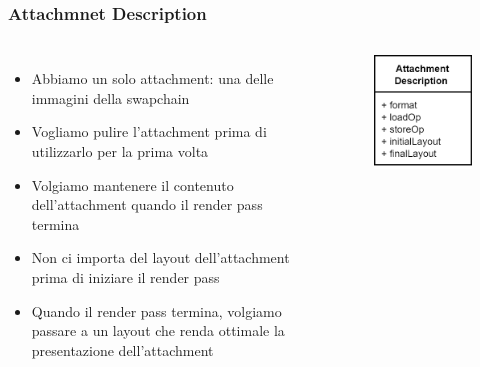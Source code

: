 \begin{frame}
\frametitle{Attachmnet Description}
\begin{columns}




\begin{itemize}
\item Abbiamo un solo attachment: una delle immagini della swapchain
\item Vogliamo pulire l'attachment prima di utilizzarlo per la prima volta
\item Volgiamo mantenere il contenuto dell'attachment quando il render pass termina
\item Non ci importa del layout dell'attachment prima di iniziare il render pass
\item Quando il render pass termina, volgiamo passare a un layout che renda ottimale la presentazione dell'attachment
\end{itemize}



\begin{figure}[ht]
    \centering
    \includegraphics[scale=0.3]{images/SlidesClearWindow/AttachmentDescription.png}
\end{figure}

\end{columns}
\end{frame}
